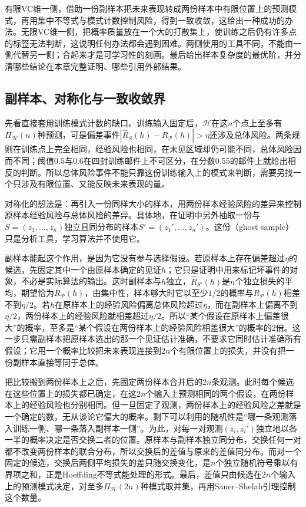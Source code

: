有限VC维一侧，借助一份副样本把未来表现转成两份样本中有限位置上的预测模式，再用集中不等式与模式计数控制风险，得到一致收敛，这给出一种成功的办法。无限VC维一侧，把概率质量放在一个大的打散集上，使训练之后仍有许多点的标签无法判断，这说明任何办法都会遇到困难。两侧使用的工具不同，不能由一侧代替另一侧；合起来才是可学习性的刻画。最后给出样本复杂度的最优阶，并分清哪些结论在本章完整证明、哪些引用外部结果。

\subsection{副样本、对称化与一致收敛界}

先看直接套用训练模式计数的缺口。训练输入固定后，$\mathcal H$在这$n$个点上至多有$\Pi_{\mathcal H}(n)$种预测，可是偏差事件$|\hat R_S(h)-R_{\mathcal P}(h)|>\eta$还涉及总体风险。两条规则在训练点上完全相同，经验风险也相同，在未见区域却仍可能不同，总体风险因而不同；阈值0.5与0.6在四封训练邮件上不可区分，在分数0.55的邮件上就给出相反的判断。所以总体风险事件不能只靠这份训练输入上的模式来判断，需要另找一个只涉及有限位置、又能反映未来表现的量。

对称化的想法是：再引入一份同样大小的样本，用两份样本经验风险的差异来控制原样本经验风险与总体风险的差异。具体地，在证明中另外抽取一份与$S=(z_1,\ldots,z_n)$独立且同分布的样本$S'=(z_1',\ldots,z_n')$。这份（ghost sample）只是分析工具，学习算法并不使用它。

副样本能起这个作用，是因为它没有参与选择假设。若原样本上存在偏差超过$\eta$的候选，先固定其中一个由原样本确定的见证$h$；它只是证明中用来标记坏事件的对象，不必是实际算法的输出。这时副样本与$h$独立，$\hat R_{S'}(h)$是$n$个独立损失的平均，期望恰为$R_{\mathcal P}(h)$，由集中性，样本够大时它以至少$1/2$的概率与$R_{\mathcal P}(h)$相差不到$\eta/2$。若$h$在原样本上的经验风险偏离总体风险超过$\eta$，而在副样本上偏离不到$\eta/2$，两份样本上的经验风险就相差超过$\eta/2$。所以“某个假设在原样本上偏差很大”的概率，至多是“某个假设在两份样本上的经验风险相差很大”的概率的2倍。这一步只需副样本把原样本选出的那一个见证估计准确，不要求它同时估计准确所有假设；它用一个概率比较把未来表现连接到$2n$个有限位置上的损失，并没有把一份副样本直接等同于总体。

把比较搬到两份样本上之后，先固定两份样本合并后的$2n$条观测。此时每个候选在这些位置上的损失都已确定，在这$2n$个输入上预测相同的两个假设，在两份样本上的经验风险也分别相同。但一旦固定了观测，两份样本上的经验风险之差就是一个确定的数，无从谈论它偏大的概率。剩下可以利用的随机性是“哪一条观测落入训练一侧、哪一条落入副样本一侧”。为此，对每一对观测$(z_i,z_i')$独立地以各一半的概率决定是否交换二者的位置。原样本与副样本独立同分布，交换任何一对都不改变两份样本的联合分布，所以交换后的差值与原来的差值同分布。而对一个固定的候选，交换后两侧平均损失的差只随交换变化，是$n$个独立随机符号乘以有界项之和，正是Hoeffding不等式能处理的形式。最后，差值只由候选在$2n$个输入上的预测模式决定，对至多$\Pi_{\mathcal H}(2n)$种模式取并集，再用Sauer--Shelah引理控制这个数量。

